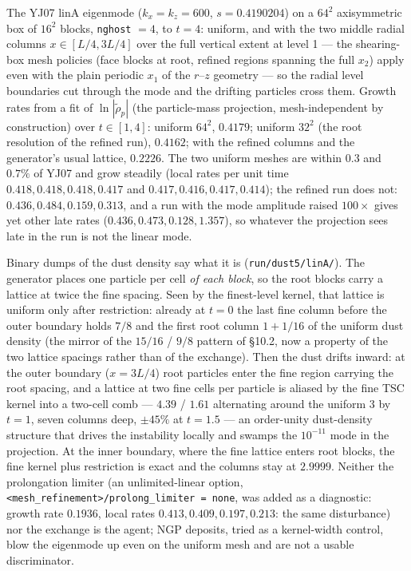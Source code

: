 \documentclass[11pt]{article}
\newcommand{\code}[1]{\texttt{#1}}
\newcommand{\file}[1]{\texttt{#1}}
\begin{document}
The YJ07 linA eigenmode ($k_x = k_z = 600$, $s = 0.4190204$) on a $64^2$ axisymmetric box
of $16^2$ blocks, \code{nghost} $= 4$, to $t = 4$: uniform, and with the two middle
radial columns $x \in [L/4, 3L/4]$ over the full vertical extent at level 1 --- the
shearing-box mesh policies (face blocks at root, refined regions spanning the full $x_2$)
apply even with the plain periodic $x_1$ of the $r$--$z$ geometry --- so the radial level
boundaries cut through the mode and the drifting particles cross them. Growth rates from a fit of
$\ln|\tilde\rho_p|$ (the particle-mass projection, mesh-independent by construction)
over $t \in [1,4]$: uniform $64^2$, $0.4179$; uniform $32^2$ (the root resolution of the
refined run), $0.4162$; with the refined columns and the generator's usual lattice,
$0.2226$. The two uniform meshes are within $0.3$ and $0.7\%$ of YJ07 and grow steadily
(local rates per unit time $0.418, 0.418, 0.418, 0.417$ and $0.417, 0.416, 0.417, 0.414$);
the refined run does not: $0.436, 0.484, 0.159, 0.313$, and a run with the mode amplitude
raised $100\times$ gives yet other late rates ($0.436, 0.473, 0.128, 1.357$), so whatever
the projection sees late in the run is not the linear mode.

Binary dumps of the dust density say what it is (\file{run/dust5/linA/}). The generator
places one particle per cell \emph{of each block}, so the root blocks carry a lattice at
twice the fine spacing. Seen by the finest-level kernel, that lattice is uniform only after
restriction: already at $t = 0$ the last fine column before the outer boundary holds
$7/8$ and the first root column $1 + 1/16$ of the uniform dust density (the mirror of the
$15/16$ / $9/8$ pattern of \S10.2, now a property of the two lattice spacings rather than
of the exchange). Then the dust drifts inward: at the outer boundary ($x = 3L/4$) root
particles enter the fine region carrying the root spacing, and a lattice at two fine cells
per particle is aliased by the fine TSC kernel into a two-cell comb --- $4.39$ / $1.61$
alternating around the uniform $3$ by $t = 1$, seven columns deep, $\pm45\%$ at
$t = 1.5$ --- an order-unity dust-density structure that drives the instability locally
and swamps the $10^{-11}$ mode in the projection. At the inner boundary, where the fine
lattice enters root blocks, the fine kernel plus restriction is exact and the columns stay
at $2.9999$. Neither the prolongation limiter (an unlimited-linear option,
\code{<mesh\_refinement>/prolong\_limiter = none}, was added as a diagnostic: growth
rate $0.1936$, local rates $0.413, 0.409, 0.197, 0.213$: the same disturbance) nor the exchange is the agent; NGP deposits, tried as a kernel-width control,
blow the eigenmode up even on the uniform mesh and are not a usable discriminator.
\end{document}
